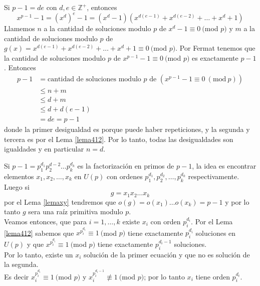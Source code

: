 \documentclass{report}
\begin{document}
\begin{myproof}
    Si $p-1=de$ con $d,e\in\mathbb{Z}^+$, entonces$$x^{p-1}-1=(x^d)^e-1=(x^d-1)(x^{d(e-1)}+x^{d(e-2)}+\dots+x^d+1)$$Llamemos $n$ a la cantidad de soluciones modulo $p$ de $x^d-1\equiv 0\ ($mod $p)$ y $m$ a la cantidad de soluciones modulo $p$ de $g(x)=x^{d(e-1)}+x^{d(e-2)}+\dots+x^d+1\equiv 0\ ($mod $p)$. Por Fermat tenemos que la cantidad de soluciones modulo $p$ de $x^{p-1}-1\equiv 0\ ($mod $p)$ es exactamente $p-1$. Entonces$$\begin{aligned} p-1 & =\text{cantidad de soluciones modulo } p\text{ de }\left( x^{p-1} -1\equiv 0\ \left(\text{mod} \ p\right)\right)\\  & \le  n+m\\  & \le d+m\\  & \le d+d( e-1)\\  & =de=p-1 \end{aligned}$$donde la primer desigualdad es porque puede haber repeticiones, y la segunda y tercera es por el Lema \ref{lema412}. Por lo tanto, todas las desigualdades son igualdades y en particular $n=d$.
\end{myproof}
\begin{myproof}
    Si $p-1=p_1^{d_1}p_2^{d-2}\dots p_k^{d_k}$ es la factorización en primos de $p-1$, la idea es encontrar elementos $x_1,x_2,\dots,x_k$ en $U(p)$ con ordenes $p_1^{d_1},p_2^{d_2},\dots,p_k^{d_k}$ respectivamente. Luego si$$g=x_1x_2\dots x_k$$por el Lema \ref{lemaxy} tendremos que $o(g)=o(x_1)\dots o(x_k)=p-1$ y por lo tanto $g$ sera una raíz primitiva modulo $p$.\\Veamos entonces, que para $i=1,\dots,k$ existe $x_i$ con orden $p_i^{d_i}$. Por el Lema \ref{lema412} sabemos que $x^{p_i^{d_i}}\equiv 1\ ($mod $p)$ tiene exactamente $p_i^{d_i}$ soluciones en $U(p)$ y que $x^{p_i^{d_i}}\equiv 1\ ($mod $p)$ tiene exactamente $p_i^{d_i-1}$ soluciones.\\Por lo tanto, existe un $x_i$ solución de la primer ecuación y que no es solución de la segunda.\\Es decir $x_i^{p_i^{d_i}}\equiv 1\ ($mod $p)$ y $x_i^{p_i^{d_i-1}}\nequiv 1\ ($mod $p)$; por lo tanto $x_i$ tiene orden $p_i^{d_i}$.
\end{myproof}
\end{document}
